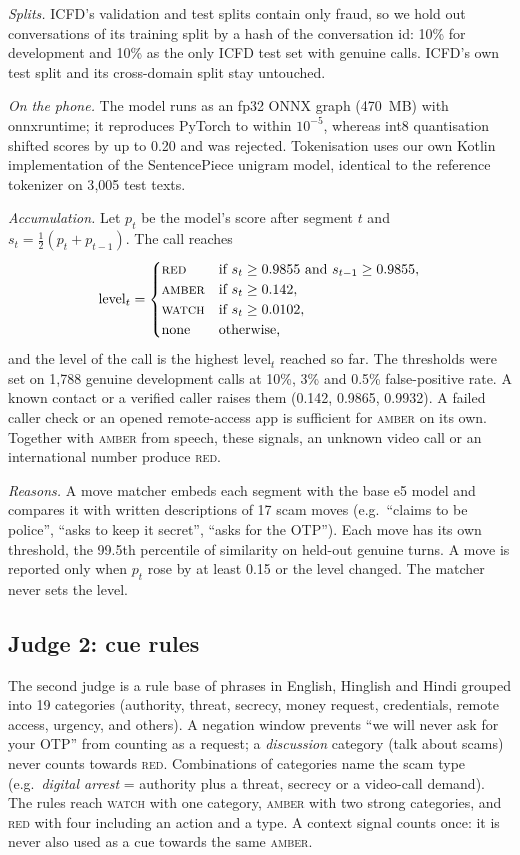 \documentclass[conference,a4paper]{IEEEtran}
\newcommand{\amber}{\textsc{amber}}
\newcommand{\red}{\textsc{red}}
\newcommand{\watch}{\textsc{watch}}
\begin{document}
\emph{Splits.} ICFD's validation and test splits contain only fraud, so we hold out conversations of its training
split by a hash of the conversation id: 10\% for development and 10\% as the only ICFD test set with genuine calls.
ICFD's own test split and its cross-domain split stay untouched.

\emph{On the phone.} The model runs as an fp32 ONNX graph (470~MB) with onnxruntime; it reproduces PyTorch to within
$10^{-5}$, whereas int8 quantisation shifted scores by up to 0.20 and was rejected. Tokenisation uses our own Kotlin
implementation of the SentencePiece unigram model, identical to the reference tokenizer on 3{,}005 test texts.

\emph{Accumulation.} Let $p_t$ be the model's score after segment $t$ and $s_t=\tfrac12(p_t+p_{t-1})$. The call reaches
\begin{equation}
\mathrm{level}_t=\begin{cases}
\red{} & \text{if } s_t \ge 0.9855 \text{ and } s_{t-1} \ge 0.9855,\\
\amber{} & \text{if } s_t \ge 0.142,\\
\watch{} & \text{if } s_t \ge 0.0102,\\
\text{none} & \text{otherwise,}
\end{cases}
\end{equation}
and the level of the call is the highest $\mathrm{level}_t$ reached so far.
The thresholds were set on 1{,}788 genuine development calls at 10\%, 3\% and 0.5\% false-positive rate. A known
contact or a verified caller raises them (0.142, 0.9865, 0.9932). A failed caller check or an opened remote-access
app is sufficient for \amber{} on its own. Together with \amber{} from speech, these signals, an unknown video
call or an international number produce \red{}.

\emph{Reasons.} A move matcher embeds each segment with the base e5 model and compares it with written descriptions
of 17 scam moves (e.g.\ ``claims to be police'', ``asks to keep it secret'', ``asks for the OTP''). Each move has its
own threshold, the 99.5th percentile of similarity on held-out genuine turns. A move is reported only when $p_t$ rose
by at least 0.15 or the level changed. The matcher never sets the level.

\subsection{Judge 2: cue rules}
The second judge is a rule base of phrases in English, Hinglish and Hindi grouped into 19 categories (authority,
threat, secrecy, money request, credentials, remote access, urgency, and others). A negation window prevents
``we will never ask for your OTP'' from counting as a request; a \emph{discussion} category (talk about scams) never
counts towards \red{}. Combinations of categories name the scam type (e.g.\ \emph{digital arrest} = authority plus
a threat, secrecy or a video-call demand). The rules reach \watch{} with one category, \amber{} with two strong
categories, and \red{} with four including an action and a type. A context signal counts once: it is never also used
as a cue towards the same \amber{}.
\end{document}
